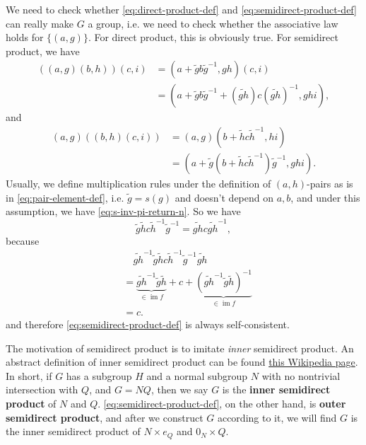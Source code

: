\documentclass[hyperref, a4paper]{article}
\newcommand*{\concept}[1]{{\textbf{#1}}}
\DeclareMathOperator{\im}{im}
\begin{document}
We need to check whether \eqref{eq:direct-product-def} and 
\eqref{eq:semidirect-product-def} can really make $G$ a group, i.e. we need to check whether the 
associative law holds for $\{(a, g)\}$. For direct product, this is obviously true.
For semidirect product, we have 
\[
    \begin{aligned}
        ((a, g) (b, h)) (c, i) &= (a + \tilde{g} b \tilde{g}^{-1}, gh) (c, i) \\
        &= (a + \tilde{g} b \tilde{g}^{-1} + (\widetilde{g h} ) c (\widetilde{g h})^{-1}, ghi),
    \end{aligned}
\]
and 
\[
    \begin{aligned}
        (a, g) ((b, h) (c, i)) &= (a, g) (b + \tilde{h} c \tilde{h}^{-1}, hi) \\
        &= (a + \tilde{g}(b + \tilde{h} c \tilde{h}^{-1}) \tilde{g}^{-1}, ghi).
    \end{aligned}
\]
Usually, we define multiplication rules under the definition of $(a, h)$-pairs as is in 
\eqref{eq:pair-element-def}, i.e. $\tilde{g} = s(g)$ and doesn't depend on $a, b$, and under this assumption, we have \eqref{eq:s-inv-pi-return-n}.
So we have
\[
    \tilde{g} \tilde{h} c \tilde{h}^{-1} \tilde{g}^{-1} = \widetilde{gh} c \widetilde{gh}^{-1},
\]
because 
\[
    \begin{aligned}
        &\quad \widetilde{gh}^{-1} \tilde{g} \tilde{h} c \tilde{h}^{-1} \tilde{g}^{-1} \widetilde{gh}  \\
        &= \underbrace{\widetilde{gh}^{-1} \tilde{g} \tilde{h}}_{\in \im f} + c + \underbrace{(\widetilde{gh}^{-1} \tilde{g} \tilde{h})^{-1}}_{\in \im f} \\
        &= c.
    \end{aligned}
\]
and therefore \eqref{eq:semidirect-product-def} is always self-consistent. 

The motivation of semidirect product is to imitate \emph{inner} semidirect product. 
An abstract definition of inner semidirect product can be found \href{https://en.wikipedia.org/wiki/Semidirect\_product\#Inner\_semidirect\_product\_definitions}{this Wikipedia page}.
In short, if $G$ has a subgroup $H$ and a normal subgroup $N$ with no nontrivial intersection with 
$Q$, and $G = NQ$, then we say $G$ is the \concept{inner semidirect product} of $N$ and $Q$.
\eqref{eq:semidirect-product-def}, on the other hand, is \concept{outer semidirect product}, and after we 
construct $G$ according to it, we will find $G$ is the inner semidirect product of $N \times e_Q$ and
$0_N \times Q$. 
\end{document}
